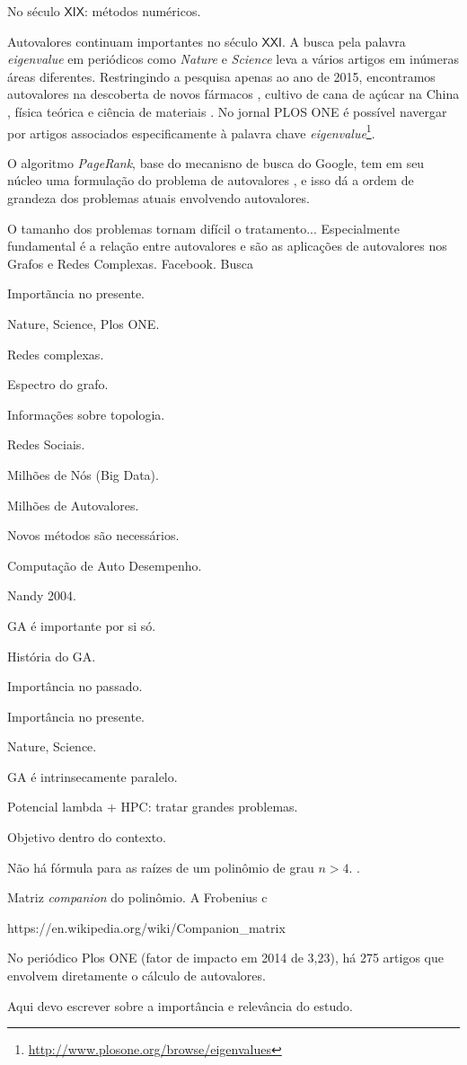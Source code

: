 	No século $\mathsf{XIX}$: métodos numéricos.

	Autovalores continuam importantes no século $\mathsf{XXI}$. A busca pela palavra \emph{eigenvalue} em periódicos como \emph{Nature} e \emph{Science} leva a vários artigos em inúmeras áreas diferentes. Restringindo a pesquisa apenas ao ano de 2015, encontramos autovalores na descoberta de novos fármacos \cite{avMedicamento2015}, cultivo de cana de açúcar na China \cite{avCana2015}, física teórica \cite{avFisTeo2015} e ciência de materiais \cite{avCienciaMateriais2015}. No jornal PLOS ONE é possível navergar por artigos associados especificamente à palavra chave \emph{eigenvalue}\footnote{\href{http://www.plosone.org/browse/eigenvalues}{http://www.plosone.org/browse/eigenvalues}}.
	
	O algoritmo \emph{PageRank}, base do mecanisno de busca do Google, tem em seu núcleo uma formulação do problema de autovalores \cite{BrinPage98}, e isso dá a ordem de grandeza dos problemas atuais envolvendo autovalores.
	
	
	O tamanho dos problemas tornam difícil o tratamento... Especialmente fundamental é a relação entre autovalores e  são as aplicações de autovalores nos Grafos e Redes Complexas. Facebook. Busca

Importãncia no presente.

	
	 
	
Nature, Science, Plos ONE.

Redes complexas.

Espectro do grafo.

Informações sobre topologia.

Redes Sociais.

Milhões de Nós (Big Data).

Milhões de Autovalores.

Novos métodos são necessários.

Computação de Auto Desempenho.

Nandy 2004.

GA é importante por si só.

História do GA.

Importância no passado.

Importância no presente.

Nature, Science.

GA é intrinsecamente paralelo.

Potencial lambda + HPC: tratar grandes problemas.

Objetivo dentro do contexto.


Não há fórmula para as raízes de um polinômio de grau $n > 4$. \cite{Pan97}.

Matriz \emph{companion} do polinômio. A Frobenius c

https://en.wikipedia.org/wiki/Companion\_matrix

No periódico Plos ONE (fator de impacto em 2014 de 3,23), há 275 artigos que envolvem diretamente o cálculo de autovalores. 

Aqui devo escrever sobre a importância e relevância do estudo. 